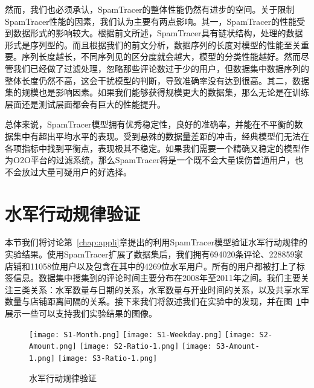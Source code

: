 然而，我们也必须承认，SpamTracer的整体性能仍然有进步的空间。关于限制SpamTracer性能的因素，我们认为主要有两点影响。其一，SpamTracer的性能受到数据形式的影响较大。根据前文所述，SpamTracer具有链状结构，处理的数据形式是序列型的。而且根据我们的前文分析，数据序列的长度对模型的性能至关重要。序列长度越长，不同序列见的区分度就会越大，模型的分类性能越好。然而尽管我们已经做了过滤处理，忽略那些评论数过于少的用户，但数据集中数据序列的整体长度仍然不高，这会干扰模型的判断，导致准确率没有达到很高。其二，数据集的规模也是影响因素。如果我们能够获得规模更大的数据集，那么无论是在训练层面还是测试层面都会有巨大的性能提升。

总体来说，SpamTracer模型拥有优秀稳定性，良好的准确率，并能在不平衡的数据集中有超出平均水平的表现。受到悬殊的数据量差距的冲击，经典模型们无法在各项指标中找到平衡点，表现极其不稳定。如果我们需要一个精确又稳定的模型作为O2O平台的过滤系统，那么SpamTracer将是一个既不会大量误伤普通用户，也不会放过大量可疑用户的好选择。


\section{水军行动规律验证}

本节我们将讨论第~\ref{chap:appli}章提出的利用SpamTracer模型验证水军行动规律的实验结果。使用SpamTracer扩展了数据集后，我们拥有694020条评论、228859家店铺和11058位用户以及包含在其中的4269位水军用户。所有的用户都被打上了标签信息。数据集中搜集到的评论时间主要分布在2008年至2011年之间。我们主要关注三类关系：水军数量与日期的关系，水军数量与开业时间的关系，以及共享水军数量与店铺距离间隔的关系。接下来我们将叙述我们在实验中的发现，并在图~\ref{fig:S}中展示一些可以支持我们实验结果的图像。

\begin{figure}[htp]
	{\texttt{[image: S1-Month.png]}}
	\hspace{4em}
	{\texttt{[image: S1-Weekday.png]}}
	\hspace{4em}
	{\texttt{[image: S2-Amount.png]}}
	\hspace{4em}
	{\texttt{[image: S2-Ratio-1.png]}}
	\hspace{4em}
	{\texttt{[image: S3-Amount-1.png]}}
	\hspace{4em}
	{\texttt{[image: S3-Ratio-1.png]}}
	\caption[水军行动规律验证]{水军行动规律验证}
	\label{fig:S}
\end{figure}

